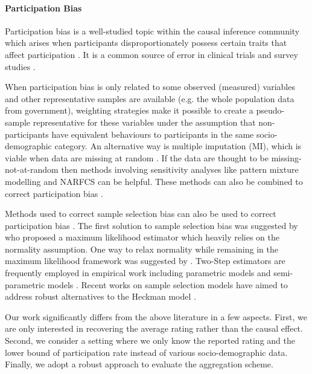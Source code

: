 \paragraph{Participation Bias}

Participation bias is a well-studied topic within the causal inference community which arises when participants disproportionately possess certain traits that affect participation \cite{elston2021participation}. It is a common source of error in clinical trials and survey studies \cite{dahrouge2019high,schoeler2023participation,schoeler2022correction,fakhouri2020investigation,coon2020evaluating}. 

When participation bias is only related to some observed (measured) variables and other representative samples are available (e.g. the whole population data from government), weighting 
strategies make it possible to create a pseudo-sample
representative for these variables \cite{robins1994estimation,schoeler2022correction} under the assumption that non-participants have equivalent behaviours to participants in the same socio-demographic category. An alternative way is multiple imputation (MI), which is viable when data are missing at random \cite{sterne2009multiple,peytchev2012multiple,alanya2015comparing,gray2013use,gorman2017adjustment}. If the data are thought to be
missing-not-at-random then methods involving sensitivity analyses like pattern mixture modelling \cite{little1993pattern} and NARFCS \cite{tompsett2018use} can be helpful. These methods can also be combined to correct participation bias \cite{gray2020correcting}.
 


Methods used to correct sample selection bias can also be used to correct participation bias \cite{verger2021online}. The first solution to sample selection bias was suggested by \citet{heckman1974shadow} who proposed a maximum likelihood estimator which heavily relies on the normality assumption. One way to relax normality while remaining in the maximum likelihood framework was suggested by \citet{lee1982some,lee1983generalized}. Two-Step estimators are frequently employed in empirical work including parametric models \cite{heckman1976common,heckman1979sample} and semi-parametric models \cite{heckman1985alternative,ahn1993semiparametric,lee1994semiparametric}. Recent works on sample selection models have aimed to address robust alternatives to the
Heckman model \cite{marchenko2012heckman, zhelonkin2016robust, de2022generalized}.

Our work significantly differs from the above literature in a few aspects. First, we are only interested in recovering the average rating rather than the causal effect. Second, we consider a setting where we only know the reported rating and the lower bound of participation rate instead of various socio-demographic data. Finally, we adopt a robust approach to evaluate the aggregation scheme.

